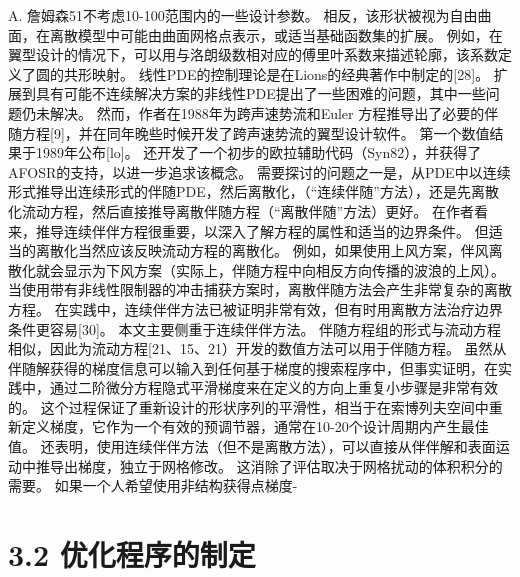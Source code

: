 \documentclass[UTF8,11pt,a4paper,openany,fontset=fandol]{ctexbook}
\begin{document}
A. 詹姆森51不考虑10-100范围内的一些设计参数。 相反，该形状被视为自由曲面，在离散模型中可能由曲面网格点表示，或适当基础函数集的扩展。 例如，在翼型设计的情况下，可以用与洛朗级数相对应的傅里叶系数来描述轮廓，该系数定义了圆的共形映射。 线性PDE的控制理论是在Lions的经典著作中制定的[28]。 扩展到具有可能不连续解决方案的非线性PDE提出了一些困难的问题，其中一些问题仍未解决。 然而，作者在1988年为跨声速势流和Euler 方程推导出了必要的伴随方程[9]，并在同年晚些时候开发了跨声速势流的翼型设计软件。 第一个数值结果于1989年公布[lo]。 还开发了一个初步的欧拉辅助代码（Syn82），并获得了AFOSR的支持，以进一步追求该概念。 需要探讨的问题之一是，从PDE中以连续形式推导出连续形式的伴随PDE，然后离散化，（“连续伴随”方法），还是先离散化流动方程，然后直接推导离散伴随方程（“离散伴随”方法）更好。 在作者看来，推导连续伴伴方程很重要，以深入了解方程的属性和适当的边界条件。 但适当的离散化当然应该反映流动方程的离散化。 例如，如果使用上风方案，伴风离散化就会显示为下风方案（实际上，伴随方程中向相反方向传播的波浪的上风）。 当使用带有非线性限制器的冲击捕获方案时，离散伴随方法会产生非常复杂的离散方程。 在实践中，连续伴伴方法已被证明非常有效，但有时用离散方法治疗边界条件更容易[30]。 本文主要侧重于连续伴伴方法。 伴随方程组的形式与流动方程相似，因此为流动方程[21、15、21）开发的数值方法可以用于伴随方程。 虽然从伴随解获得的梯度信息可以输入到任何基于梯度的搜索程序中，但事实证明，在实践中，通过二阶微分方程隐式平滑梯度来在定义的方向上重复小步骤是非常有效的。 这个过程保证了重新设计的形状序列的平滑性，相当于在索博列夫空间中重新定义梯度，它作为一个有效的预调节器，通常在10-20个设计周期内产生最佳值。 还表明，使用连续伴伴方法（但不是离散方法），可以直接从伴伴解和表面运动中推导出梯度，独立于网格修改。 这消除了评估取决于网格扰动的体积积分的需要。 如果一个人希望使用非结构获得点梯度-

\section{3.2 优化程序的制定}
\end{document}
